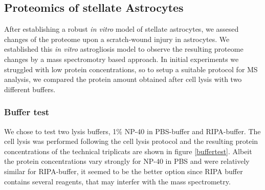 \documentclass[a4paper,11pt,bibtotocnumbered]{article}
\begin{document}
\subsection{Proteomics of stellate Astrocytes}

After establishing a robust \textit{in vitro} model of stellate astrocytes, we assesed changes of the proteome upon a scratch-wound injury in astrocytes. We established this \textit{in vitro} astrogliosis model to observe the resulting proteome changes by a mass spectromotry based approach. In initial experiments we struggled with low protein concentrations, so to setup a suitable protocol for MS analysis, we compared the protein amount obtained after cell lysis with two different buffers.


\subsubsection{Buffer test}

We chose to test two lysis buffers, 1\% NP-40 in PBS-buffer and RIPA-buffer. The cell lysis was performed following the cell lysis protocol and the resulting protein concentrations of the technical triplicats are shown in figure \ref{buffertest}. Albeit the protein concentrations vary strongly for NP-40 in PBS and were relatively similar for RIPA-buffer, it seemed to be the better option since RIPA buffer contains several reagents, that may interfer with the mass spectrometry.






\end{document}
